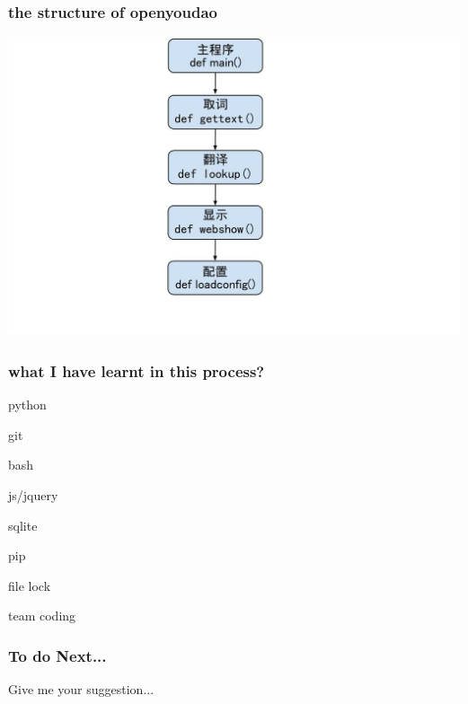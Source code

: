 \documentclass[10pt]{beamer}
\begin{document}
\begin{frame}
  \frametitle{\Large{the structure  of openyoudao}}
\begin{center} 
  \includegraphics[width=1.15\textwidth]{construct.jpg}
     
\end{center}

\end{frame}

\begin{frame}
  \frametitle{\Large{what I have learnt in this process?}}
\begin{itemize}
\Large{ 
  \item python
  \item git
  \item bash
  \item js/jquery
  \item sqlite
  \item pip
  \item file lock
  \item team coding}
\end{itemize}

\end{frame}

\begin{frame}
  \frametitle{\Large{To do Next... }}
\Huge{Give me your suggestion...}

\end{frame}
\end{document}
